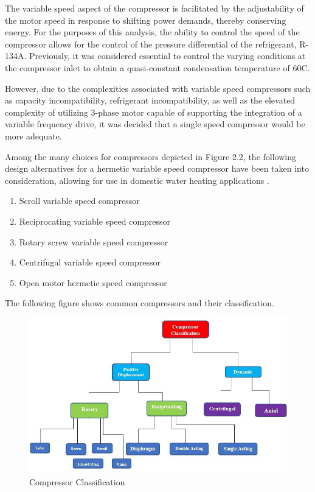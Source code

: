 \medskip
The variable speed aspect of the compressor is facilitated by the adjustability of the motor speed in response to shifting power demands, thereby conserving energy. For the purposes of this analysis, the ability to control the speed of the compressor allows for the control of the pressure differential of the refrigerant, R-134A. Previously, it was considered essential to control the varying conditions at the compressor inlet to obtain a quasi-constant condensation temperature of 60\textdegree C. 

\medskip
However, due to the complexities associated with variable speed compressors such as capacity incompatibility, refrigerant incompatibility, as well as the elevated complexity of utilizing 3-phase motor capable of supporting the integration of a variable frequency drive, it was decided that a single speed compressor would be more adequate.

\medskip
Among the many choices for compressors depicted in Figure 2.2, the following design alternatives for a hermetic variable speed compressor have been taken into consideration, allowing for use in domestic water heating applications \cite{how_compressor_works} \cite{vapor_compression_refrigeration}.

\medskip
\begin{enumerate}[itemsep=3mm, parsep=-1mm]
    \item Scroll variable speed compressor \cite{scroll_compressors}
    \item Reciprocating variable speed compressor \cite{variable_speed_hermetic}
    \item Rotary screw variable speed compressor
    \item Centrifugal variable speed compressor
    \item Open motor hermetic speed compressor
\end{enumerate}

\medskip
The following figure shows common compressors and their classification.

\medskip
\begin{figure}[ht]
    \centering
    \includegraphics[width=\textwidth]{images/compressor_types.jpg}
    \caption{Compressor Classification \cite{air_compressor}}
\end{figure}

